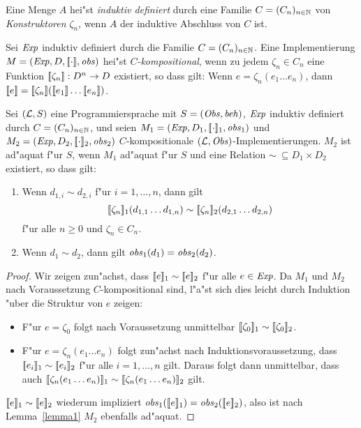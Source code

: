 \documentclass[12pt,a4paper]{article}
\begin{document}
\begin{definition}
  Eine Menge $A$ hei"st \emph{induktiv definiert} durch eine Familie $C = (C_n)_{n\in\mathbb N}$ von
  \emph{Konstruktoren} $\zeta_n$, wenn $A$ der induktive Abschluss von $C$ ist.
\end{definition}

\begin{definition}[Kompositionalit"at]
  Sei $\mathit{Exp}$ induktiv definiert durch die Familie $C=(C_n)_{n\in\mathbb N}$.
  Eine Implementierung $M=(\mathit{Exp},D,[\![\cdot]\!],\mathit{obs})$ hei"st \emph{$C$-kompositional},
  wenn zu jedem $\zeta_n \in C_n$ eine Funktion $[\![\zeta_n]\!]: D^n \to D$ existiert, so dass gilt:
  Wenn $e = \zeta_n (e_1 \ldots e_n)$, dann 
  $\semantic{e} = \semantic{\zeta_n}(\semantic{e_1} \ldots \semantic{e_n})$.
\end{definition}

\begin{theorem}
  Sei $(\mathcal L,S)$ eine Programmiersprache mit $S=(\mathit{Obs},\mathit{beh})$, $\mathit{Exp}$ induktiv definiert durch
  $C=(C_n)_{n\in\mathbb N}$, und seien $M_1=(\mathit{Exp},D_1,[\![\cdot]\!]_1,\mathit{obs}_1)$ und
  $M_2 = (\mathit{Exp},D_2,[\![\cdot]\!]_2,\mathit{obs}_2)$ $C$-kompositionale $(\mathcal L,\mathit{Obs})$-Implementierungen.
  $M_2$ ist ad"aquat f"ur $S$, wenn $M_1$ ad"aquat f"ur $S$ und eine Relation $\sim\ \subseteq D_1 \times D_2$
  existiert, so dass gilt:
  \begin{enumerate}
  \item Wenn $d_{1,i} \sim d_{2,i}$ f"ur $i=1,\ldots,n$, dann gilt
    \[[\![\zeta_n]\!]_1 (d_{1,1} \ldots d_{1,n}) \sim [\![\zeta_n]\!]_2 (d_{2,1} \ldots d_{2,n})\]
    f"ur alle $n \ge 0$ und $\zeta_n \in C_n$.
  \item Wenn $d_1 \sim d_2$, dann gilt $\mathit{obs}_1(d_1) = \mathit{obs}_2(d_2)$.
  \end{enumerate}
\end{theorem}

\begin{proof}
  Wir zeigen zun"achst, dass $[\![e]\!]_1 \sim [\![e]\!]_2$ f"ur alle $e\in\mathit{Exp}$. Da $M_1$ und $M_2$
  nach Voraussetzung $C$-kompositional sind, l"a"st sich dies leicht durch Induktion "uber die Struktur
  von $e$ zeigen:
  \begin{itemize}
  \item F"ur $e = \zeta_0$ folgt nach Voraussetzung unmittelbar $[\![\zeta_0]\!]_1 \sim [\![\zeta_0]\!]_2$.
  \item F"ur $e = \zeta_n(e_1 \ldots e_n)$ folgt zun"achst nach Induktionsvoraussetzung, dass
    $[\![e_i]\!]_1 \sim [\![e_i]\!]_2$ f"ur alle $i=1,\ldots,n$ gilt. Daraus folgt dann unmittelbar,
    dass auch $[\![\zeta_n(e_1 \ldots e_n)]\!]_1 \sim [\![\zeta_n(e_1 \ldots e_n)]\!]_2$ gilt.
  \end{itemize}
  $[\![e]\!]_1 \sim [\![e]\!]_2$ wiederum impliziert $\mathit{obs}_1([\![e]\!]_1)=\mathit{obs}_2([\![e]\!]_2)$,
  also ist nach Lemma~\ref{lemma1} $M_2$ ebenfalls ad"aquat.
\end{proof}
\end{document}
